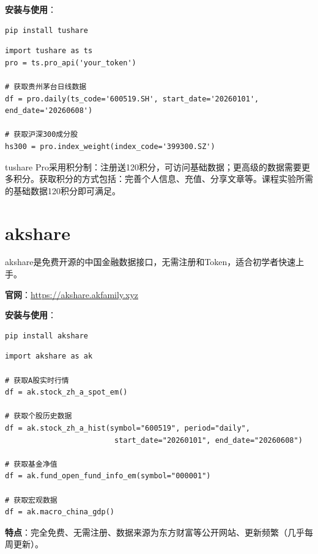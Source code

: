 \textbf{安装与使用}：

\begin{lstlisting}[style=shell]
pip install tushare
\end{lstlisting}

\begin{lstlisting}[style=python]
import tushare as ts
pro = ts.pro_api('your_token')

# 获取贵州茅台日线数据
df = pro.daily(ts_code='600519.SH', start_date='20260101', end_date='20260608')

# 获取沪深300成分股
hs300 = pro.index_weight(index_code='399300.SZ')
\end{lstlisting}

\begin{notebox}[tushare积分]
tushare Pro采用积分制：注册送120积分，可访问基础数据；更高级的数据需要更多积分。获取积分的方式包括：完善个人信息、充值、分享文章等。课程实验所需的基础数据120积分即可满足。
\end{notebox}

\section{akshare}

akshare是免费开源的中国金融数据接口，无需注册和Token，适合初学者快速上手。

\textbf{官网}：\url{https://akshare.akfamily.xyz}

\textbf{安装与使用}：

\begin{lstlisting}[style=shell]
pip install akshare
\end{lstlisting}

\begin{lstlisting}[style=python]
import akshare as ak

# 获取A股实时行情
df = ak.stock_zh_a_spot_em()

# 获取个股历史数据
df = ak.stock_zh_a_hist(symbol="600519", period="daily",
                         start_date="20260101", end_date="20260608")

# 获取基金净值
df = ak.fund_open_fund_info_em(symbol="000001")

# 获取宏观数据
df = ak.macro_china_gdp()
\end{lstlisting}

\textbf{特点}：完全免费、无需注册、数据来源为东方财富等公开网站、更新频繁（几乎每周更新）。

